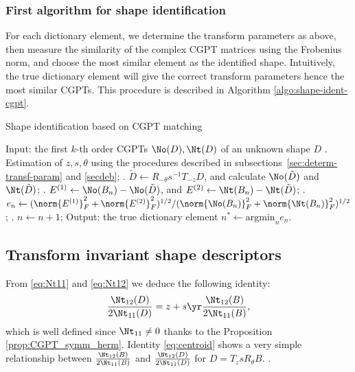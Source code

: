 \subsubsection{First algorithm for shape identification}\label{sec:first-algor-shape}
For each dictionary element, we determine the transform parameters
as above, then measure the similarity of the complex CGPT matrices
using the Frobenius norm, and choose the most similar element as
the identified shape. Intuitively, the true dictionary element
will give the correct transform parameters hence the most similar
CGPTs. This procedure is described in Algorithm
\ref{algo:shape-ident-cgpt}.

\begin{algorithm}
  \caption{Shape identification based on CGPT matching}
  \label{algo:shape-ident-cgpt}
  \begin{algorithmic}
    \STATE Input: the first $k$-th order CGPTs $\No(D), \Nt(D)$ of an unknown shape $D$
    . Estimation of $z, s, \theta$ using the procedures described in
    subsections~\ref{sec:determ-transf-param} and \ref{secdeb};
    . $\tilde D \leftarrow R_{-\theta}s^{-1}T_{-z}D$, and calculate $\No(\tilde D)$ and  $\Nt(\tilde
    D)$;
    . $E^{(1)}\leftarrow \No(B_n) - \No(\tilde D)$, and $E^{(2)}\leftarrow \Nt(B_n) - \Nt(\tilde
    D)$;
    .
    $e_n\leftarrow (\norm{E^{(1)}}_F^2 + \norm{E^{(2)}}_F^2)^{1/2}/
    (\norm{\No(B_n)}_F^2 + \norm{\Nt(B_n)}_F^2)^{1/2}$;
    . $n\leftarrow n+1$;
    \ENDFOR
    \STATE Output: the true dictionary element $n^*\leftarrow \mbox{argmin}_n
    e_n$.
  \end{algorithmic}
\end{algorithm}

\subsection{Transform invariant shape descriptors}
\label{sec:transf-invar-shape} From \eqref{eq:Nt11} and
\eqref{eq:Nt12} we deduce the following identity:
\begin{align}
  \frac{\Nt_{12}(D)}{2\Nt_{11}(D)} = z +
  s\yr\frac{\Nt_{12}(B)}{2\Nt_{11}(B)}, \label{eq:centroid}
\end{align}
which is well defined since $\Nt_{11}\neq 0$ thanks to the
Proposition \ref{prop:CGPT_symm_herm}. Identity
\eqref{eq:centroid} shows a very simple relationship between
$\frac{\Nt_{12}(B)}{2\Nt_{11}(B)}$ and
$\frac{\Nt_{12}(D)}{2\Nt_{11}(D)}$ for $D= T_z s R_\theta B$. .


